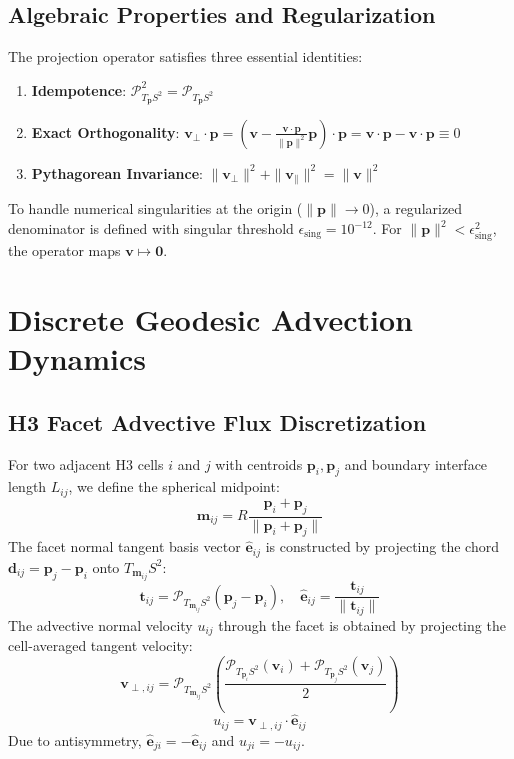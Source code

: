 \documentclass[10pt,journal,compsoc]{IEEEtran}
\begin{document}
\subsection{Algebraic Properties and Regularization}
The projection operator satisfies three essential identities:
\begin{enumerate}
    \item \textbf{Idempotence}: $\mathcal{P}_{T_{\mathbf{p}}S^2}^2 = \mathcal{P}_{T_{\mathbf{p}}S^2}$
    \item \textbf{Exact Orthogonality}: $\mathbf{v}_\perp \cdot \mathbf{p} = (\mathbf{v} - \frac{\mathbf{v} \cdot \mathbf{p}}{\|\mathbf{p}\|^2} \mathbf{p}) \cdot \mathbf{p} = \mathbf{v} \cdot \mathbf{p} - \mathbf{v} \cdot \mathbf{p} \equiv 0$
    \item \textbf{Pythagorean Invariance}: $\|\mathbf{v}_\perp\|^2 + \|\mathbf{v}_\parallel\|^2 = \|\mathbf{v}\|^2$
\end{enumerate}
To handle numerical singularities at the origin ($\|\mathbf{p}\| \to 0$), a regularized denominator is defined with singular threshold $\epsilon_{\text{sing}} = 10^{-12}$. For $\|\mathbf{p}\|^2 < \epsilon_{\text{sing}}^2$, the operator maps $\mathbf{v} \mapsto \mathbf{0}$.

\section{Discrete Geodesic Advection Dynamics}

\subsection{H3 Facet Advective Flux Discretization}
For two adjacent H3 cells $i$ and $j$ with centroids $\mathbf{p}_i, \mathbf{p}_j$ and boundary interface length $L_{ij}$, we define the spherical midpoint:
\begin{equation}
\mathbf{m}_{ij} = R \frac{\mathbf{p}_i + \mathbf{p}_j}{\|\mathbf{p}_i + \mathbf{p}_j\|}
\end{equation}
The facet normal tangent basis vector $\hat{\mathbf{e}}_{ij}$ is constructed by projecting the chord $\mathbf{d}_{ij} = \mathbf{p}_j - \mathbf{p}_i$ onto $T_{\mathbf{m}_{ij}}S^2$:
\begin{equation}
\mathbf{t}_{ij} = \mathcal{P}_{T_{\mathbf{m}_{ij}}S^2}(\mathbf{p}_j - \mathbf{p}_i), \quad \hat{\mathbf{e}}_{ij} = \frac{\mathbf{t}_{ij}}{\|\mathbf{t}_{ij}\|}
\end{equation}
The advective normal velocity $u_{ij}$ through the facet is obtained by projecting the cell-averaged tangent velocity:
\begin{equation}
\mathbf{v}_{\perp, ij} = \mathcal{P}_{T_{\mathbf{m}_{ij}}S^2}\left( \frac{\mathcal{P}_{T_{\mathbf{p}_i}S^2}(\mathbf{v}_i) + \mathcal{P}_{T_{\mathbf{p}_j}S^2}(\mathbf{v}_j)}{2} \right)
\end{equation}
\begin{equation}
u_{ij} = \mathbf{v}_{\perp, ij} \cdot \hat{\mathbf{e}}_{ij}
\end{equation}
Due to antisymmetry, $\hat{\mathbf{e}}_{ji} = -\hat{\mathbf{e}}_{ij}$ and $u_{ji} = -u_{ij}$.
\end{document}
